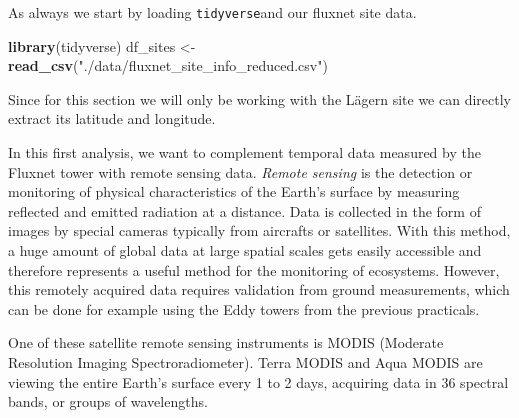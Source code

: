 \documentclass[
]{book}
\newenvironment{Shaded}{\begin{snugshade}}{\end{snugshade}}
\newcommand{\KeywordTok}[1]{\textcolor[rgb]{0.13,0.29,0.53}{\textbf{#1}}}
\newcommand{\NormalTok}[1]{#1}
\newcommand{\OperatorTok}[1]{\textcolor[rgb]{0.81,0.36,0.00}{\textbf{#1}}}
\newcommand{\StringTok}[1]{\textcolor[rgb]{0.31,0.60,0.02}{#1}}
\begin{document}
As always we start by loading \texttt{tidyverse}and our fluxnet site data.

\begin{Shaded}
\begin{Highlighting}[]
\KeywordTok{library}\NormalTok{(tidyverse)}
\NormalTok{df_sites <-}\StringTok{ }\KeywordTok{read_csv}\NormalTok{(}\StringTok{"./data/fluxnet_site_info_reduced.csv"}\NormalTok{)}
\end{Highlighting}
\end{Shaded}

Since for this section we will only be working with the Lägern site we can directly extract its latitude and longitude.

\begin{Shaded}
\end{Shaded}

In this first analysis, we want to complement temporal data measured by the Fluxnet tower with remote sensing data. \emph{Remote sensing} is the detection or monitoring of physical characteristics of the Earth's surface by measuring reflected and emitted radiation at a distance. Data is collected in the form of images by special cameras typically from aircrafts or satellites. With this method, a huge amount of global data at large spatial scales gets easily accessible and therefore represents a useful method for the monitoring of ecosystems. However, this remotely acquired data requires validation from ground measurements, which can be done for example using the Eddy towers from the previous practicals.

One of these satellite remote sensing instruments is MODIS (Moderate Resolution Imaging Spectroradiometer). Terra MODIS and Aqua MODIS are viewing the entire Earth's surface every 1 to 2 days, acquiring data in 36 spectral bands, or groups of wavelengths.
\end{document}
